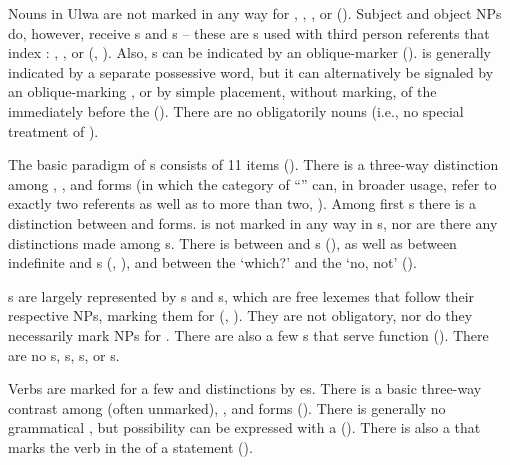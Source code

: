 Nouns in Ulwa are not marked in any way for , , , or  (). Subject and object NPs do, however, receive s and s -- these are s used with third person referents that index : , , or  (, ). Also, s can be indicated by an  oblique-marker  ().  is generally indicated by a separate possessive word, but it can alternatively be signaled by an  oblique-marking , or by simple placement, without marking, of the  immediately before the  (). There are no obligatorily  nouns (i.e., no special treatment of ).

The basic paradigm of s consists of 11 items (). There is a three-way  distinction among , , and  forms (in which the category of “” can, in broader usage, refer to exactly two referents as well as to more than two, ). Among first   s there is a distinction between  and  forms.  is not marked in any way in s, nor are there any  distinctions made among s. There is  between  and  s (), as well as between  indefinite and s (, ), and between the  ‘which?’ and the  ‘no, not’ ().

s are largely represented by s and s, which are free lexemes that follow their respective NPs, marking them for  (, ). They are not obligatory, nor do they necessarily mark NPs for . There are also a few s that serve  function (). There are no  s, s, s, or s.

  Verbs are marked for a few  and  distinctions by es. There is a basic three-way contrast among  (often unmarked), , and  forms (). There is generally no grammatical , but  possibility can be expressed with a   (). There is also a   that marks the verb in the  of a  statement ().


